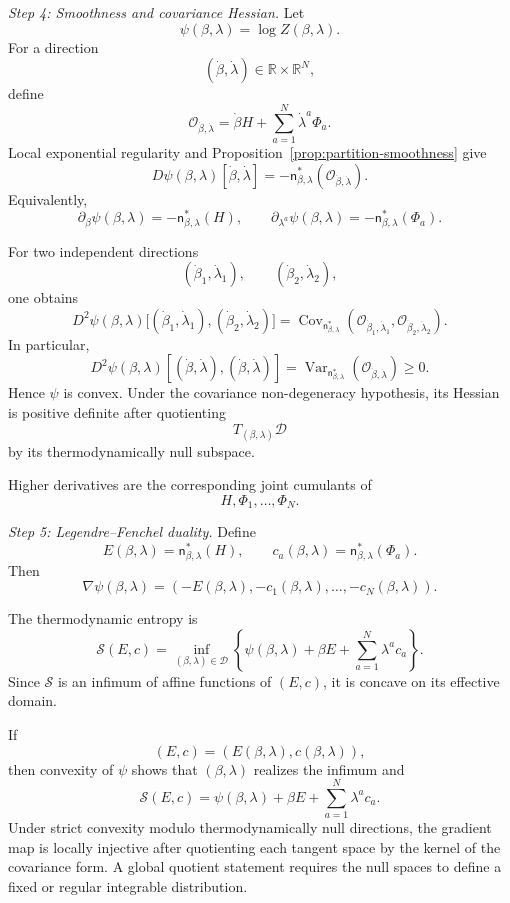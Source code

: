 \documentclass[11pt,reqno]{amsart}
\begin{document}
\medskip
\noindent
\textit{Step 4: Smoothness and covariance Hessian.}
Let
\[
\psi(\beta,\lambda)
=
\log Z(\beta,\lambda).
\]
For a direction
\[
(\dot\beta,\dot\lambda)\in
\mathbb R\times\mathbb R^N,
\]
define
\[
\mathcal O_{\dot\beta,\dot\lambda}
=
\dot\beta H+
\sum_{a=1}^{N}\dot\lambda^a\Phi_a.
\]
Local exponential regularity and
Proposition~\ref{prop:partition-smoothness} give
\[
D\psi(\beta,\lambda)
[\dot\beta,\dot\lambda]
=
-
\mathsf n_{\beta,\lambda}^*
\left(
\mathcal O_{\dot\beta,\dot\lambda}
\right).
\]
Equivalently,
\[
\partial_\beta\psi(\beta,\lambda)
=
-\mathsf n_{\beta,\lambda}^*(H),
\qquad
\partial_{\lambda^a}\psi(\beta,\lambda)
=
-\mathsf n_{\beta,\lambda}^*(\Phi_a).
\]

For two independent directions
\[
(\dot\beta_1,\dot\lambda_1),
\qquad
(\dot\beta_2,\dot\lambda_2),
\]
one obtains
\[
D^2\psi(\beta,\lambda)
\big[
(\dot\beta_1,\dot\lambda_1),
(\dot\beta_2,\dot\lambda_2)
\big]
=
\operatorname{Cov}_{\mathsf n_{\beta,\lambda}^*}
\left(
\mathcal O_{\dot\beta_1,\dot\lambda_1},
\mathcal O_{\dot\beta_2,\dot\lambda_2}
\right).
\]
In particular,
\[
D^2\psi(\beta,\lambda)
[
(\dot\beta,\dot\lambda),
(\dot\beta,\dot\lambda)
]
=
\operatorname{Var}_{\mathsf n_{\beta,\lambda}^*}
\left(
\mathcal O_{\dot\beta,\dot\lambda}
\right)
\geq 0.
\]
Hence $\psi$ is convex. Under the covariance non-degeneracy hypothesis,
its Hessian is positive definite after quotienting
\[
T_{(\beta,\lambda)}\mathcal D
\]
by its thermodynamically null subspace.

Higher derivatives are the corresponding joint cumulants of
\[
H,\Phi_1,\ldots,\Phi_N.
\]

\medskip
\noindent
\textit{Step 5: Legendre--Fenchel duality.}
Define
\[
E(\beta,\lambda)
=
\mathsf n_{\beta,\lambda}^*(H),
\qquad
c_a(\beta,\lambda)
=
\mathsf n_{\beta,\lambda}^*(\Phi_a).
\]
Then
\[
\nabla\psi(\beta,\lambda)
=
\left(
-E(\beta,\lambda),
-c_1(\beta,\lambda),
\ldots,
-c_N(\beta,\lambda)
\right).
\]

The thermodynamic entropy is
\[
\mathcal S(E,c)
=
\inf_{(\beta,\lambda)\in\mathcal D}
\left\{
\psi(\beta,\lambda)
+
\beta E
+
\sum_{a=1}^{N}\lambda^ac_a
\right\}.
\]
Since $\mathcal S$ is an infimum of affine functions of $(E,c)$, it is
concave on its effective domain.

If
\[
(E,c)
=
\left(
E(\beta,\lambda),
c(\beta,\lambda)
\right),
\]
then convexity of $\psi$ shows that $(\beta,\lambda)$ realizes the
infimum and
\[
\mathcal S(E,c)
=
\psi(\beta,\lambda)
+
\beta E
+
\sum_{a=1}^{N}\lambda^ac_a.
\]
Under strict convexity modulo thermodynamically null directions, the
gradient map is locally injective after quotienting each tangent space
by the kernel of the covariance form. A global quotient statement
requires the null spaces to define a fixed or regular integrable
distribution.
\end{document}
